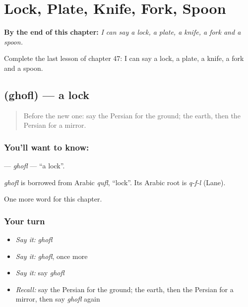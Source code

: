 
\chapter{Lock, Plate, Knife, Fork, Spoon}
\label{ch:fa-lock-plate-knife-fork-spoon}

\begin{chapteropening}
\textbf{By the end of this chapter:} \emph{I can say a lock, a plate, a knife, a fork and a spoon.}

Complete the last lesson of chapter 47: I can say a lock, a plate, a knife, a fork and a spoon.
\end{chapteropening}

\section[\texorpdfstring{\fa{قفل} (ghofl)}{قفل (ghofl)}]{ (ghofl) — a lock}

\label{lesson:FA-C47-ghofl}



\begin{quote}
Before the new one: say the Persian for the ground; the earth, then the Persian for a mirror.
\end{quote}

\subsection*{You'll want to know: }
\textbf{} — \emph{ghofl} — \textquotedblleft{}a lock\textquotedblright{}.

\begin{cousinweb}
\emph{ghofl} is borrowed from Arabic \emph{qufl}, \textquotedblleft{}lock\textquotedblright{}. Its Arabic root is \emph{q-f-l} (Lane).
\end{cousinweb}

\begin{grammarlens}[title={What you've built}]
One more word for this chapter.
\end{grammarlens}

\subsection*{Your turn}
\begin{itemize}
\raggedright
  \item \emph{Say it:} \emph{ghofl}
  \item \emph{Say it:} \emph{ghofl}, once more
  \item \emph{Say it:} say \emph{ghofl}
  \item \emph{Recall:} say the Persian for the ground; the earth, then the Persian for a mirror, then say \emph{ghofl} again
\end{itemize}

